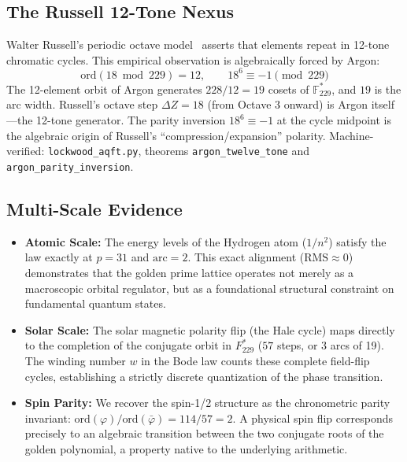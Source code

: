 \subsection{The Russell 12-Tone Nexus}

Walter Russell's periodic octave model~\cite{Russell1926} asserts that elements repeat in 12-tone chromatic cycles. This empirical observation is algebraically forced by Argon:
\begin{equation}
    \text{ord}(18 \bmod 229) = 12, \qquad 18^6 \equiv -1 \pmod{229}
\end{equation}
The 12-element orbit of Argon generates $228/12 = 19$ cosets of $\mathbb{F}_{229}^*$, and $19$ is the arc width. Russell's octave step $\Delta Z = 18$ (from Octave 3 onward) is Argon itself---the 12-tone generator. The parity inversion $18^6 \equiv -1$ at the cycle midpoint is the algebraic origin of Russell's ``compression/expansion'' polarity. Machine-verified: \texttt{lockwood\_aqft.py}, theorems \texttt{argon\_twelve\_tone} and \texttt{argon\_parity\_inversion}.

\subsection{Multi-Scale Evidence}\label{sec:evidence}
\begin{itemize}
    \item \textbf{Atomic Scale:} The energy levels of the Hydrogen atom ($1/n^2$) satisfy the law exactly at $p=31$ and $\text{arc}=2$. This exact alignment ($\text{RMS} \approx 0$) demonstrates that the golden prime lattice operates not merely as a macroscopic orbital regulator, but as a foundational structural constraint on fundamental quantum states.
    \item \textbf{Solar Scale:} The solar magnetic polarity flip (the Hale cycle) maps directly to the completion of the conjugate orbit in $F_{229}^*$ ($57$ steps, or 3 arcs of 19). The winding number $w$ in the Bode law counts these complete field-flip cycles, establishing a strictly discrete quantization of the phase transition.
    \item \textbf{Spin Parity:} We recover the spin-1/2 structure as the chronometric parity invariant: $\text{ord}(\varphi)/\text{ord}(\bar{\varphi}) = 114/57 = 2$. A physical spin flip corresponds precisely to an algebraic transition between the two conjugate roots of the golden polynomial, a property native to the underlying arithmetic.
\end{itemize}

